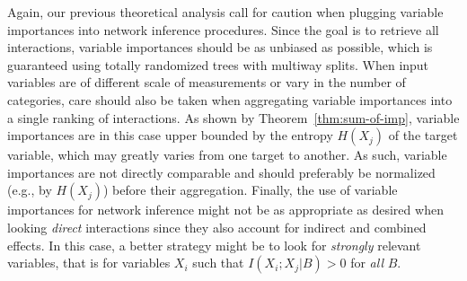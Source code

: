 Again, our previous theoretical analysis call for caution when plugging
variable importances into network inference procedures. Since the goal is to
retrieve all interactions, variable importances should be as unbiased as
possible, which is guaranteed using totally randomized trees with multiway
splits. When input variables are of different scale of measurements or vary in
the number of categories, care should also be taken when aggregating variable
importances into a single ranking of interactions. As shown by Theorem~\ref{thm:sum-of-imp},
variable importances are in this case upper bounded by the entropy $H(X_j)$ of the target variable,
which may greatly varies from one target to another. As such, variable
importances are not directly comparable and should preferably be normalized (e.g., by
$H(X_j)$) before their aggregation. Finally, the use of variable
importances for network inference might not be as appropriate as desired when looking
\textit{direct} interactions since they also account for indirect and combined effects.
In this case, a better strategy might be to look for \textit{strongly} relevant
variables, that is for variables $X_i$ such that $I(X_i;X_j|B) > 0$ for \textit{all} $B$.



